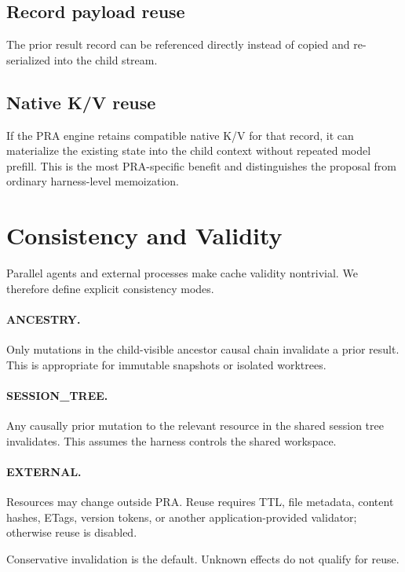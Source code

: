 \documentclass[11pt]{article}
\begin{document}
\subsection{Record payload reuse}

The prior result record can be referenced directly instead of copied and re-serialized into the child stream.

\subsection{Native K/V reuse}

If the PRA engine retains compatible native K/V for that record, it can materialize the existing state into the child context without repeated model prefill. This is the most PRA-specific benefit and distinguishes the proposal from ordinary harness-level memoization.

\section{Consistency and Validity}

Parallel agents and external processes make cache validity nontrivial. We therefore define explicit consistency modes.

\paragraph{ANCESTRY.}
Only mutations in the child-visible ancestor causal chain invalidate a prior result. This is appropriate for immutable snapshots or isolated worktrees.

\paragraph{SESSION\_TREE.}
Any causally prior mutation to the relevant resource in the shared session tree invalidates. This assumes the harness controls the shared workspace.

\paragraph{EXTERNAL.}
Resources may change outside PRA. Reuse requires TTL, file metadata, content hashes, ETags, version tokens, or another application-provided validator; otherwise reuse is disabled.

Conservative invalidation is the default. Unknown effects do not qualify for reuse.
\end{document}

